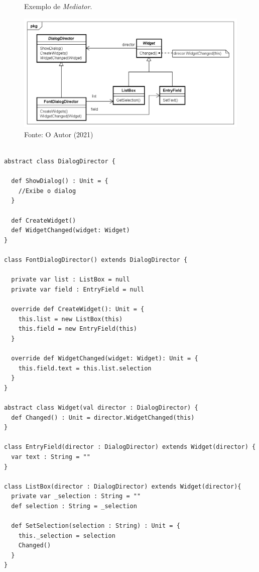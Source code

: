 \begin{figure}[htb]
	\caption{\label{mediator_exemplo}Exemplo de \textit{Mediator}.}
	\begin{center}
	    \includegraphics[scale=0.5]{5_padroes-contexto-funcional/5.3_comportamentais/5.3.05_mediator/mediator_exemplo.png}
	\end{center}
  \caption*{Fonte: O Autor (2021)}
\end{figure}

\begin{lstlisting}[caption={\textit{Mediator} Orientado a Objetos.},label=oomediator]

abstract class DialogDirector {

  def ShowDialog() : Unit = {
    //Exibe o dialog
  }

  def CreateWidget()
  def WidgetChanged(widget: Widget)
}

class FontDialogDirector() extends DialogDirector {

  private var list : ListBox = null
  private var field : EntryField = null

  override def CreateWidget(): Unit = {
    this.list = new ListBox(this)
    this.field = new EntryField(this)
  }

  override def WidgetChanged(widget: Widget): Unit = {
    this.field.text = this.list.selection
  }
}

abstract class Widget(val director : DialogDirector) {
  def Changed() : Unit = director.WidgetChanged(this)
}

class EntryField(director : DialogDirector) extends Widget(director) {
  var text : String = ""
}

class ListBox(director : DialogDirector) extends Widget(director){
  private var _selection : String = ""
  def selection : String = _selection

  def SetSelection(selection : String) : Unit = {
    this._selection = selection
    Changed()
  }
}
    
\end{lstlisting}

